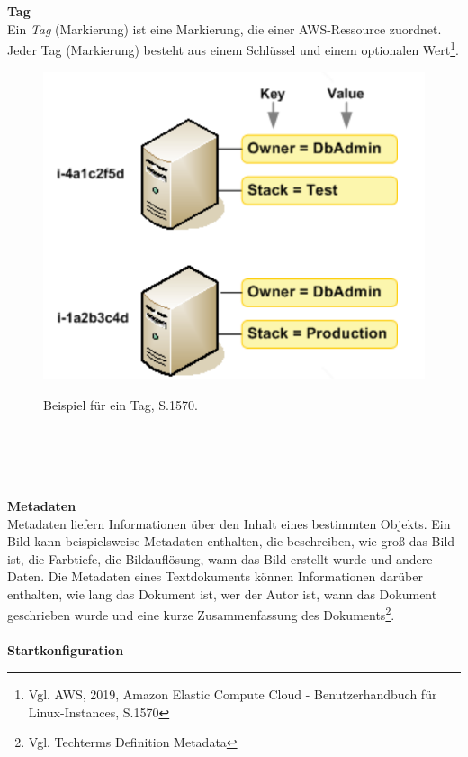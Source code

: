 \\\\
\textbf{Tag}\\
Ein \textit{Tag} (Markierung) ist eine Markierung, die einer AWS-Ressource zuordnet. Jeder Tag (Markierung) besteht aus einem Schlüssel und einem optionalen Wert\footnote{Vgl. AWS, 2019, Amazon Elastic Compute Cloud - Benutzerhandbuch für Linux-Instances, S.1570\cite{AMZ26}}.
\begin{figure}[h!]
  \centering
  \includegraphics[scale=0.4]{sources/TagExample}
  \caption[Beispiel für ein Tag]{}\label{fig:TagExample}
  Beispiel für ein Tag{\cite{AMZ26}, S.1570}.
\end{figure}
\\\\
\\\\
\textbf{Metadaten}\\
Metadaten liefern Informationen über den Inhalt eines bestimmten Objekts. Ein Bild kann beispielsweise Metadaten enthalten, die beschreiben, wie groß das Bild ist, die Farbtiefe, die Bildauflösung, wann das Bild erstellt wurde und andere Daten. Die Metadaten eines Textdokuments können Informationen darüber enthalten, wie lang das Dokument ist, wer der Autor ist, wann das Dokument geschrieben wurde und eine kurze Zusammenfassung des Dokuments\footnote{Vgl. Techterms Definition Metadata\cite{MET}}.
\\\\
\textbf{Startkonfiguration}\\
